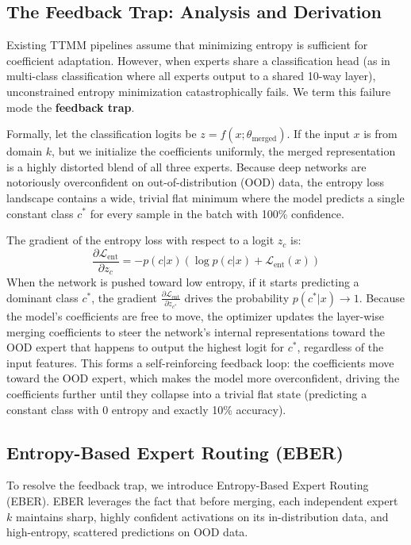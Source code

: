 \documentclass{article}
\theoremstyle{plain}
\theoremstyle{definition}
\theoremstyle{remark}
\begin{document}
\subsection{The Feedback Trap: Analysis and Derivation}
Existing TTMM pipelines assume that minimizing entropy is sufficient for coefficient adaptation. However, when experts share a classification head (as in multi-class classification where all experts output to a shared 10-way layer), unconstrained entropy minimization catastrophically fails. We term this failure mode the \textbf{feedback trap}.

Formally, let the classification logits be $z = f(x; \theta_{\text{merged}})$. If the input $x$ is from domain $k$, but we initialize the coefficients uniformly, the merged representation is a highly distorted blend of all three experts. Because deep networks are notoriously overconfident on out-of-distribution (OOD) data, the entropy loss landscape contains a wide, trivial flat minimum where the model predicts a single constant class $c^*$ for every sample in the batch with 100\% confidence. 

The gradient of the entropy loss with respect to a logit $z_c$ is:
\begin{equation}
\frac{\partial \mathcal{L}_{\text{ent}}}{\partial z_c} = - p(c|x) \left( \log p(c|x) + \mathcal{L}_{\text{ent}}(x) \right)
\end{equation}
When the network is pushed toward low entropy, if it starts predicting a dominant class $c^*$, the gradient $\frac{\partial \mathcal{L}_{\text{ent}}}{\partial z_{c^*}}$ drives the probability $p(c^*|x) \to 1$. Because the model's coefficients are free to move, the optimizer updates the layer-wise merging coefficients to steer the network's internal representations toward the OOD expert that happens to output the highest logit for $c^*$, regardless of the input features. This forms a self-reinforcing feedback loop: the coefficients move toward the OOD expert, which makes the model more overconfident, driving the coefficients further until they collapse into a trivial flat state (predicting a constant class with 0 entropy and exactly 10\% accuracy).

\subsection{Entropy-Based Expert Routing (EBER)}
To resolve the feedback trap, we introduce Entropy-Based Expert Routing (EBER). EBER leverages the fact that before merging, each independent expert $k$ maintains sharp, highly confident activations on its in-distribution data, and high-entropy, scattered predictions on OOD data. 
\end{document}
